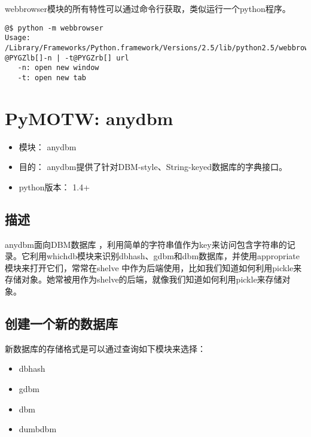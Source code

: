 \documentclass[a4paper,10pt,english]{manual}
\begin{document}
webbrowser模块的所有特性可以通过命令行获取，类似运行一个python程序。

\begin{Verbatim}[commandchars=@\[\]]
@$ python -m webbrowser
Usage: /Library/Frameworks/Python.framework/Versions/2.5/lib/python2.5/webbrowser.py @PYGZlb[]-n | -t@PYGZrb[] url
   -n: open new window
   -t: open new tab
\end{Verbatim}

\resetcurrentobjects

\clearpage
\section{PyMOTW: anydbm}
\begin{itemize}
\item {} 
模块： anydbm

\item {} 
目的： anydbm提供了针对DBM-style、String-keyed数据库的字典接口。

\item {} 
python版本： 1.4+

\end{itemize}


\subsection{描述}

anydbm面向DBM数据库 ，利用简单的字符串值作为key来访问包含字符串的记录。它利用whichdb模块来识别dbhash、gdbm和dbm数据库，并使用appropriate模块来打开它们，常常在shelve 中作为后端使用，比如我们知道如何利用pickle来存储对象。她常被用作为shelve的后端，就像我们知道如何利用pickle来存储对象。


\subsection{创建一个新的数据库}

新数据库的存储格式是可以通过查询如下模块来选择：
\begin{itemize}
\item {} 
dbhash

\item {} 
gdbm

\item {} 
dbm

\item {} 
dumbdbm

\end{itemize}
\end{document}

